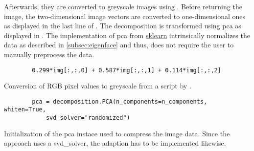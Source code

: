 Afterwards, they are converted to greyscale images using .
Before returning the image, the two-dimensional image vectors are converted to one-dimensional ones as displayed in the last line of .
The decomposition is transformed using \ac{pca} as displayed in .
The implementation of \ac{pca} from \href{https://scikit-learn.org/stable/modules/generated/sklearn.decomposition.PCA.html}{sklearn} 
intrinsically normalizes the data as described in \autoref{subsec:eigenface} and thus, does not require the user to manually preprocess the data.


\begin{listing}[htp]
    \begin{verbatim}
        0.299*img[:,:,0] + 0.587*img[:,:,1] + 0.114*img[:,:,2]
    \end{verbatim}
    \caption{Conversion of RGB pixel values to greyscale from a script by \thesissupervisor{}.}
    \label{lst:rgb2grey}
\end{listing}

\begin{listing}[htp]
    \begin{verbatim}
        pca = decomposition.PCA(n_components=n_components, whiten=True, 
            svd_solver="randomized")
    \end{verbatim}
    \caption{Initialization of the \ac{pca} instace used to compress the image data.
    Since the \eigenfaces{} approach uses a svd\_solver, the adaption \eigendocs{} has to be implemented likewise.
    }
    \label{lst:pca_svd}
\end{listing}


